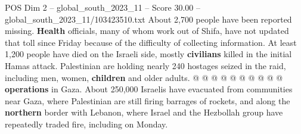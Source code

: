 \begin{textsample}{POS Dim 2 – global\_south\_2023\_11 – Score 30.00 – global\_south\_2023\_11/103423510.txt}
About 2,700 people have been reported missing. \textbf{Health} officials, many of whom work out of Shifa, have not updated that toll since Friday because of the difficulty of collecting information.
At least 1,200 people have died on the Israeli side, mostly \textbf{civilians} killed in the initial Hamas attack.
Palestinian are holding nearly 240 hostages seized in the raid, including men, women, \textbf{children} and older adults. @ @ @ @ @ @ @ @ @ @ \textbf{operations} in Gaza.
About 250,000 Israelis have evacuated from communities near Gaza, where Palestinian are still firing barrages of rockets, and along the \textbf{northern} border with Lebanon, where Israel and the Hezbollah group have repeatedly traded fire, including on Monday.

\end{textsample}
